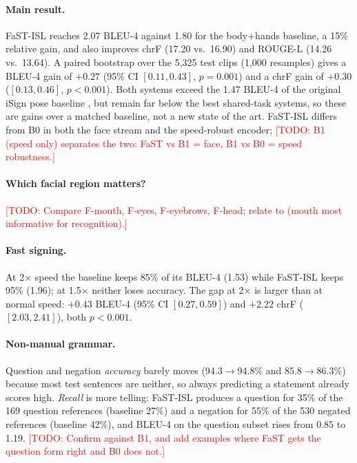 \documentclass[11pt]{article}
\newcommand{\todo}[1]{\textcolor{red}{[TODO: #1]}}
\newcommand{\fast}{FaST-ISL}
\begin{document}


\paragraph{Main result.} \fast{} reaches 2.07 BLEU-4 against 1.80 for the body+hands baseline, a 15\%
relative gain, and also improves chrF (17.20 vs.\ 16.90) and ROUGE-L (14.26 vs.\ 13.64). A paired
bootstrap over the 5{,}325 test clips (1{,}000 resamples) gives a BLEU-4 gain of $+0.27$ (95\% CI
$[0.11, 0.43]$, $p=0.001$) and a chrF gain of $+0.30$ ($[0.13, 0.46]$, $p<0.001$). Both systems exceed
the 1.47 BLEU-4 of the original iSign pose baseline \citep{joshi2024isign}, but remain far below the best
shared-task systems, so these are gains over a matched baseline, not a new state of the art. \fast{}
differs from B0 in both the face stream and the speed-robust encoder;
\todo{B1 (speed only) separates the two: FaST vs B1 = face, B1 vs B0 = speed robustness.}

\paragraph{Which facial region matters?} \todo{Compare F-mouth, F-eyes, F-eyebrows, F-head; relate to
\citet{pham2025facial} (mouth most informative for recognition).}

\paragraph{Fast signing.} At 2$\times$ speed the baseline keeps 85\% of its BLEU-4 (1.53) while
\fast{} keeps 95\% (1.96); at 1.5$\times$ neither loses accuracy. The gap at 2$\times$ is larger than at
normal speed: $+0.43$ BLEU-4 (95\% CI $[0.27, 0.59]$) and $+2.22$ chrF ($[2.03, 2.41]$), both $p<0.001$.

\paragraph{Non-manual grammar.} Question and negation \emph{accuracy} barely moves (94.3$\to$94.8\%
and 85.8$\to$86.3\%) because most test sentences are neither, so always predicting a statement already
scores high. \emph{Recall} is more telling: \fast{} produces a question for 35\% of the 169 question
references (baseline 27\%) and a negation for 55\% of the 530 negated references (baseline 42\%), and
BLEU-4 on the question subset rises from 0.85 to 1.19. \todo{Confirm against B1, and add examples where
FaST gets the question form right and B0 does not.}
\end{document}

